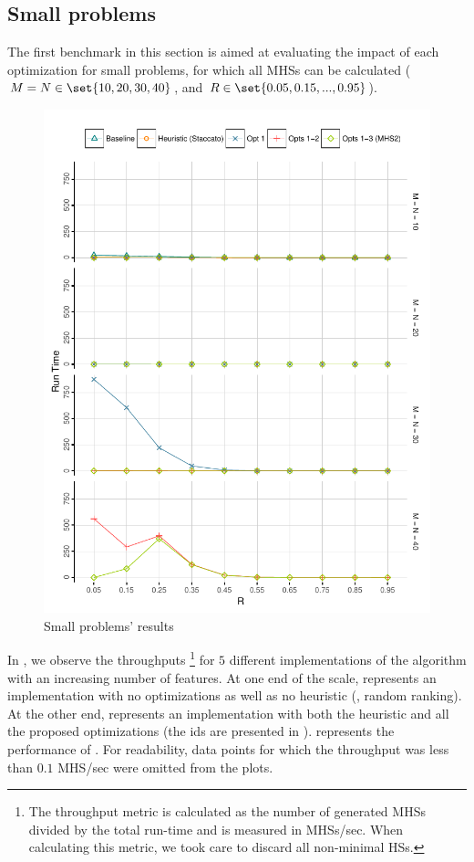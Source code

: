 \subsection{Small problems}
\label{sec:mhs2o:results:small}
The first benchmark in this section is aimed at evaluating the impact
of each optimization for small problems, for which all \acp{MHS} can
be calculated ($M = N \in \set{10, 20, 30, 40}$, and $R \in
\set{0.05,0.15,...,0.95}$).

\begin{figure}[!ht]
  \includegraphics[page=3]{figures/mhs2/figures/optim_small}
  \caption{Small problems' results\label{fig:mhs2o:results:small}}
\end{figure}

In , we observe the throughputs%
%
\footnote{The throughput metric is calculated as the number of
  generated \acp{MHS} divided by the total run-time and is measured in
  \acp{MHS}/sec. When calculating this metric, we took care to discard
  all non-minimal \acp{HS}.}
%
for $5$ different implementations of the algorithm with an increasing
number of features.
%
At one end of the scale,  represents an
implementation with no optimizations as well as no heuristic (\ie,
random ranking).
%
At the other end,  represents an implementation with both
the  heuristic and all the proposed optimizations
(the ids are presented in ).
%
 represents the performance of \staccato{}.
%
For readability, data points for which the throughput was less than
$0.1$ \ac{MHS}/sec were omitted from the plots.




